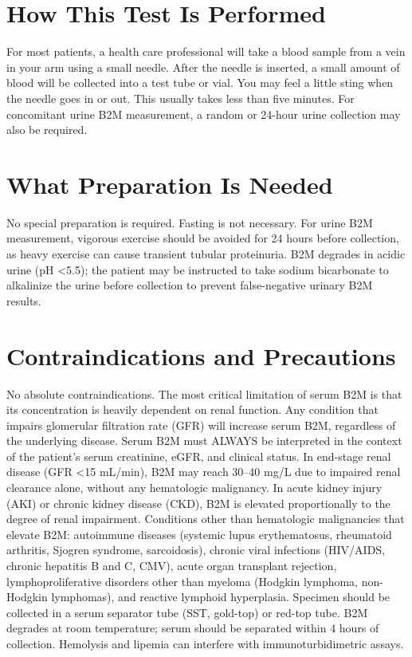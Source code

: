 \section*{How This Test Is Performed}
For most patients, a health care professional will take a blood sample from a vein in your arm using a small needle. After the needle is inserted, a small amount of blood will be collected into a test tube or vial. You may feel a little sting when the needle goes in or out. This usually takes less than five minutes. For concomitant urine B2M measurement, a random or 24-hour urine collection may also be required.

\section*{What Preparation Is Needed}
No special preparation is required. Fasting is not necessary. For urine B2M measurement, vigorous exercise should be avoided for 24 hours before collection, as heavy exercise can cause transient tubular proteinuria. B2M degrades in acidic urine (pH <5.5); the patient may be instructed to take sodium bicarbonate to alkalinize the urine before collection to prevent false-negative urinary B2M results.

\section*{Contraindications and Precautions}
No absolute contraindications. The most critical limitation of serum B2M is that its concentration is heavily dependent on renal function. Any condition that impairs glomerular filtration rate (GFR) will increase serum B2M, regardless of the underlying disease. Serum B2M must ALWAYS be interpreted in the context of the patient's serum creatinine, eGFR, and clinical status. In end-stage renal disease (GFR <15 mL/min), B2M may reach 30--40 mg/L due to impaired renal clearance alone, without any hematologic malignancy. In acute kidney injury (AKI) or chronic kidney disease (CKD), B2M is elevated proportionally to the degree of renal impairment. Conditions other than hematologic malignancies that elevate B2M: autoimmune diseases (systemic lupus erythematosus, rheumatoid arthritis, Sjogren syndrome, sarcoidosis), chronic viral infections (HIV/AIDS, chronic hepatitis B and C, CMV), acute organ transplant rejection, lymphoproliferative disorders other than myeloma (Hodgkin lymphoma, non-Hodgkin lymphomas), and reactive lymphoid hyperplasia. Specimen should be collected in a serum separator tube (SST, gold-top) or red-top tube. B2M degrades at room temperature; serum should be separated within 4 hours of collection. Hemolysis and lipemia can interfere with immunoturbidimetric assays.

